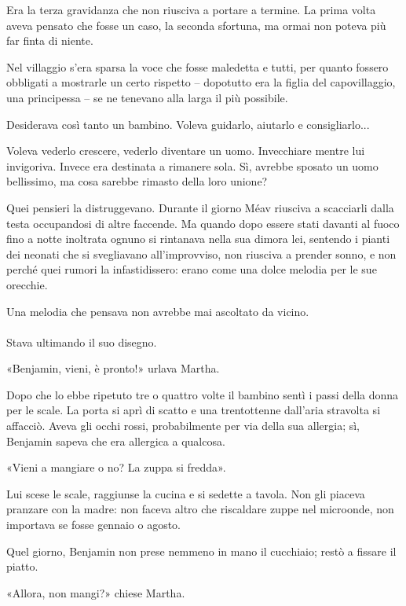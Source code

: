 \documentclass[a4paper,12pt]{book}
\begin{document}
Era la terza gravidanza che non riusciva a portare a termine. La prima volta
aveva pensato che fosse un caso, la seconda sfortuna, ma ormai non poteva più
far finta di niente.

Nel villaggio s'era sparsa la voce che fosse maledetta e tutti, per quanto
fossero obbligati a mostrarle un certo rispetto -- dopotutto era la figlia del
capovillaggio, una principessa -- se ne tenevano alla larga il più possibile.

Desiderava così tanto un bambino. Voleva guidarlo, aiutarlo e consigliarlo...

Voleva vederlo crescere, vederlo diventare un uomo. Invecchiare mentre lui
invigoriva. Invece era destinata a rimanere sola. Sì, avrebbe sposato un uomo
bellissimo, ma cosa sarebbe rimasto della loro unione?

Quei pensieri la distruggevano. Durante il giorno Méav riusciva a scacciarli
dalla testa occupandosi di altre faccende. Ma quando dopo essere stati davanti
al fuoco fino a notte inoltrata ognuno si rintanava nella sua dimora lei,
sentendo i pianti dei neonati che si svegliavano all'improvviso, non riusciva a
prender sonno, e non perché quei rumori la infastidissero: erano come una dolce
melodia per le sue orecchie.

Una melodia che pensava non avrebbe mai ascoltato da vicino.

\paragraph{}
Stava ultimando il suo disegno.

«Benjamin, vieni, è pronto!» urlava Martha.

Dopo che lo ebbe ripetuto tre o quattro volte il bambino sentì i passi della
donna per le scale. La porta si aprì di scatto e una trentottenne dall'aria
stravolta si affacciò. Aveva gli occhi rossi, probabilmente per via della sua
allergia; sì, Benjamin sapeva che era allergica a qualcosa.

«Vieni a mangiare o no? La zuppa si fredda».

Lui scese le scale, raggiunse la cucina e si sedette a tavola. Non gli piaceva
pranzare con la madre: non faceva altro che riscaldare zuppe nel microonde, non
importava se fosse gennaio o agosto.

Quel giorno, Benjamin non prese nemmeno in mano il cucchiaio; restò a fissare
il piatto.

«Allora, non mangi?» chiese Martha.
\end{document}
